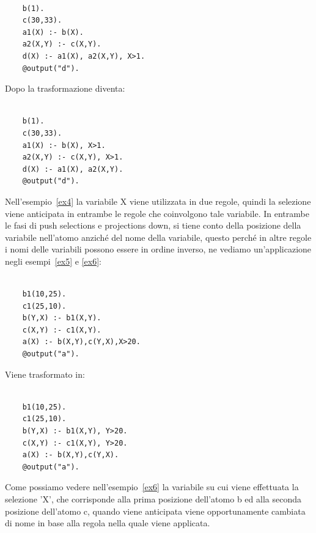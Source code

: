 \begin{example}\label{ex3}
\normalfont
{}
	\begin{lstlisting}
	
	b(1). 
	c(30,33). 
	a1(X) :- b(X). 
	a2(X,Y) :- c(X,Y). 
	d(X) :- a1(X), a2(X,Y), X>1. 
	@output("d").
	\end{lstlisting}
\end{example}
Dopo la trasformazione diventa: 
\begin{example}\label{ex4}
\normalfont
{}
	\begin{lstlisting}
	
	b(1). 
	c(30,33). 
	a1(X) :- b(X), X>1. 
	a2(X,Y) :- c(X,Y), X>1. 
	d(X) :- a1(X), a2(X,Y). 
	@output("d").
	\end{lstlisting}
\end{example}
Nell'esempio~\ref{ex4} la variabile X viene utilizzata in due regole, quindi la selezione viene anticipata in entrambe le regole che coinvolgono tale variabile. \newline
In entrambe le fasi di push selections e projections down, si tiene conto della posizione della variabile nell'atomo anziché del nome della variabile, questo perché in altre regole i nomi delle variabili possono essere in ordine inverso, ne vediamo un'applicazione negli esempi~\ref{ex5} e \ref{ex6}:
\begin{example}\label{ex5}
	\normalfont
	\begin{lstlisting}
	
	b1(10,25). 
	c1(25,10). 
	b(Y,X) :- b1(X,Y). 
	c(X,Y) :- c1(X,Y). 
	a(X) :- b(X,Y),c(Y,X),X>20. 
	@output("a").
	\end{lstlisting}
\end{example}
Viene trasformato in:
\begin{example}\label{ex6}
\normalfont
{}
	\begin{lstlisting}
	
	b1(10,25). 
	c1(25,10). 
	b(Y,X) :- b1(X,Y), Y>20. 
	c(X,Y) :- c1(X,Y), Y>20. 
	a(X) :- b(X,Y),c(Y,X). 
	@output("a").
	\end{lstlisting}
\end{example}
Come possiamo vedere nell'esempio~\ref{ex6} la variabile su cui viene effettuata la selezione 'X', che corrisponde alla prima posizione dell'atomo b ed alla seconda posizione dell'atomo c, quando viene anticipata viene opportunamente cambiata di nome in base alla regola nella quale viene applicata. \newline \newline
